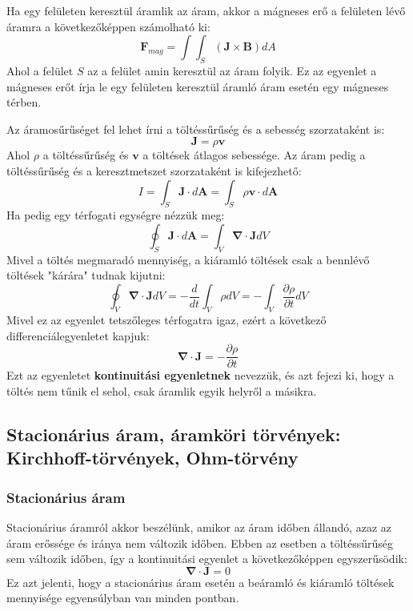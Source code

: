 \documentclass[../main.tex]{subfiles}
\begin{document}
Ha egy felületen keresztül áramlik az áram, akkor a mágneses erő a felületen lévő áramra a következőképpen számolható ki:
\begin{equation}
    \mathbf{F}_{mag} = \int \int_S (\mathbf{J} \times \mathbf{B}) dA
\end{equation}
Ahol a felület $S$ az a felület amin keresztül az áram folyik. Ez az egyenlet a mágneses erőt írja le egy felületen keresztül áramló áram esetén egy mágneses térben.

Az áramosűrűséget fel lehet írni a töltéssűrűség és a sebesség szorzataként is:
\begin{equation}
    \mathbf{J} = \rho \mathbf{v}
\end{equation}
Ahol $\rho$ a töltéssűrűség és $\mathbf{v}$ a töltések átlagos sebessége. Az áram pedig a töltéssűrűség és a keresztmetszet szorzataként is kifejezhető:
\begin{equation}
    I = \int_S \mathbf{J} \cdot d\mathbf{A} = \int_S \rho \mathbf{v} \cdot d\mathbf{A}
\end{equation}
Ha pedig egy térfogati egységre nézzük meg:
\begin{equation}
    \oint_S \mathbf{J} \cdot d\mathbf{A} = \int_V \boldsymbol{\nabla} \cdot \mathbf{J} dV
\end{equation}
Mivel a töltés megmaradó mennyiség, a kiáramló töltések csak a bennlévő töltések "kárára" tudnak kijutni:
\begin{equation}
    \oint_V \boldsymbol{\nabla} \cdot \mathbf{J} dV = - \frac{d}{dt} \int_V \rho dV = - \int_V \frac{\partial \rho}{\partial t} dV
\end{equation}
Mivel ez az egyenlet tetszőleges térfogatra igaz, ezért a következő differenciálegyenletet kapjuk:
\begin{equation}
    \boxed{\boldsymbol{\nabla} \cdot \mathbf{J} = - \frac{\partial \rho}{\partial t}}
\end{equation}
Ezt az egyenletet \textbf{kontinuitási egyenletnek} nevezzük, és azt fejezi ki, hogy a töltés nem tűnik el sehol, csak áramlik egyik helyről a másikra.


\subsection{Stacionárius áram, áramköri törvények: Kirchhoff-törvények, Ohm-törvény}

\subsubsection{Stacionárius áram}
Stacionárius áramról akkor beszélünk, amikor az áram időben állandó, azaz az áram erőssége és iránya nem változik időben. Ebben az esetben a töltéssűrűség sem változik időben, így a kontinuitási egyenlet a következőképpen egyszerűsödik:
\begin{equation}
    \boldsymbol{\nabla} \cdot \mathbf{J} = 0
\end{equation}
Ez azt jelenti, hogy a stacionárius áram esetén a beáramló és kiáramló töltések mennyisége egyensúlyban van minden pontban.
\end{document}

